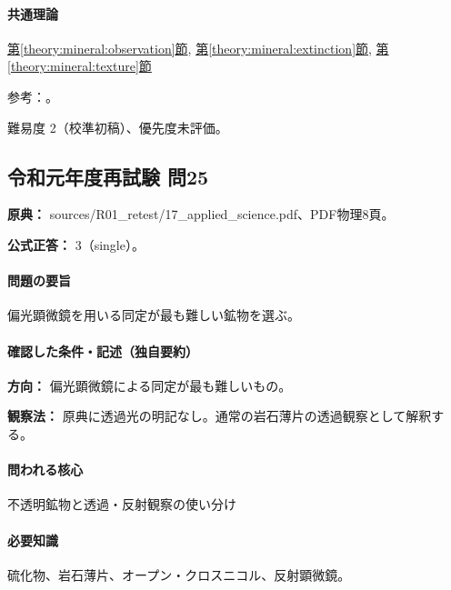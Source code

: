 \paragraph{共通理論} \hyperref[theory:mineral:observation]{第\ref*{theory:mineral:observation}節}, \hyperref[theory:mineral:extinction]{第\ref*{theory:mineral:extinction}節}, \hyperref[theory:mineral:texture]{第\ref*{theory:mineral:texture}節}

\par 参考：\cite{nelson_biaxial}。

\par 難易度 2（校準初稿）、優先度未評価。

\subsection{令和元年度再試験 問25}
\label{q:r01-ret-applied-25}

\noindent\textbf{原典：} sources/R01\_retest/17\_applied\_science.pdf、PDF物理8頁。

\textbf{公式正答：} 3（single）。

\paragraph{問題の要旨} 偏光顕微鏡を用いる同定が最も難しい鉱物を選ぶ。

\paragraph{確認した条件・記述（独自要約）}\mbox{}\par

\noindent\textbf{方向：} 偏光顕微鏡による同定が最も難しいもの。\par

\noindent\textbf{観察法：} 原典に透過光の明記なし。通常の岩石薄片の透過観察として解釈する。\par

\paragraph{問われる核心} 不透明鉱物と透過・反射観察の使い分け

\paragraph{必要知識} 硫化物、岩石薄片、オープン・クロスニコル、反射顕微鏡。

